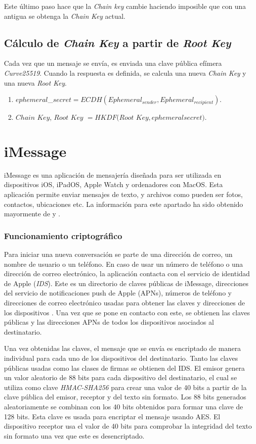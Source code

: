 Este último paso hace que la \emph{Chain key} cambie haciendo imposible que con una  antigua se obtenga la \emph{Chain Key} actual.

\subsection{Cálculo de \emph{Chain Key} a partir de \emph{Root Key}}
Cada vez que un mensaje se envía, es enviada una clave pública efímera \emph{Curve25519}. Cuando la respuesta es definida, se calcula una nueva \emph{Chain Key} y una nueva \emph{Root Key}.
\begin{enumerate}
	\item $ephemeral$\_$secret = ECDH(Ephemeral_{sender}, Ephemeral_{recipient})$.
	\item $Chain$ $Key$, $Root$ $Key$ $= HKDF(Root$ $Key, ephemeral$\textunderscore$secret)$.
\end{enumerate}

\section{iMessage}
iMessage es una aplicación de mensajería diseñada para ser utilizada en dispositivos iOS, iPadOS, Apple Watch y ordenadores con MacOS. Esta aplicación permite enviar mensajes de texto, y archivos como pueden ser fotos, contactos, ubicaciones etc. La información para este apartado ha sido obtenido mayormente de \cite{apple2} y \cite{apple1}.

\subsubsection{Funcionamiento criptográfico}
Para iniciar una nueva conversación se parte de una dirección de correo, un nombre de usuario o un teléfono. En caso de usar un número de teléfono o una dirección de correo electrónico, la aplicación contacta con el servicio de identidad de Apple (\emph{IDS}). Este es un directorio de claves públicas de iMessage, direcciones del servicio de notificaciones push de Apple (APNs), números de teléfono y direcciones de correo electrónico usadas para obtener las claves y direcciones de los dispositivos \cite{ids}. Una vez que se pone en contacto con este, se obtienen las claves públicas y las direcciones APNs de todos los dispositivos asociados al destinatario.

Una vez obtenidas las claves, el mensaje que se envía es encriptado de manera individual para cada uno de los dispositivos del destinatario. Tanto las claves públicas usadas como las clases de firmas se obtienen del IDS. El emisor genera un valor aleatorio de 88 bits para cada dispositivo del destinatario, el cual se utiliza como clave \emph{HMAC-SHA256} para crear una valor de 40 bits a partir de la clave pública del emisor, receptor y del texto sin formato. Los 88 bits generados aleatoriamente se combinan con los 40 bits obtenidos para formar una clave de 128 bits. Esta clave es usada para encriptar el mensaje usando AES.
El dispositivo receptor usa el valor de 40 bits para comprobar la integridad del texto sin formato una vez que este es desencriptado.

